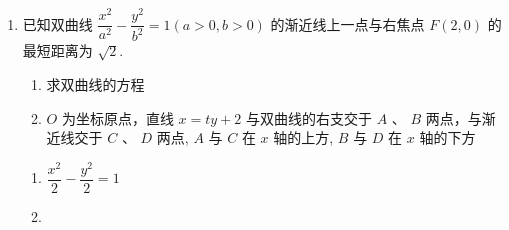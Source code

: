\begin{enumerate}
\begin{enumerate}
\begin{jieda}
\begin{enumerate}
                因为$M$ 的纵坐标为 $\sqrt{3}$，根据韦达定理可知$N$ 的纵坐标为 $\dfrac{6}{\left( {6 - 4\sqrt{3}}\right)  \times  \sqrt{3}} =  - \left( {\sqrt{3} + 2}\right)$ ,
                
                故$\bigtriangleup {F}_{1}{MN}$ 的面积为 $S = \dfrac{1}{2}\left| {{F}_{1}{F}_{2}}\right|  \cdot  \left( {\sqrt{3} + \sqrt{3} + 2}\right)  = 2\sqrt{3} \times  \left( {2 + 2\sqrt{3}}\right)  = {12} + 4\sqrt{3}$ .
            \end{enumerate}
        \end{jieda}

        \item 已知双曲线 $\dfrac{{x}^{2}}{{a}^{2}} - \dfrac{{y}^{2}}{{b}^{2}} = 1\left( {a > 0,b > 0}\right)$ 的渐近线上一点与右焦点 $F\left( {2,0}\right)$ 的最短距离为 $\sqrt{2}$.
        \begin{enumerate}
            \item 求双曲线的方程
            \item $O$ 为坐标原点，直线 $x = {ty} + 2$ 与双曲线的右支交于 $A$ 、 $B$ 两点，与渐近线交于 $C$ 、 $D$ 两点, $A$ 与 $C$ 在 $x$ 轴的上方, $B$ 与 $D$ 在 $x$ 轴的下方
        \end{enumerate}
        \begin{jieda}
            \begin{enumerate}
                \item $\dfrac{x^2}{2} - \dfrac{y^2}{2} = 1$
                \item {}
\end{enumerate}
\end{jieda}
\end{enumerate}
\end{enumerate}

